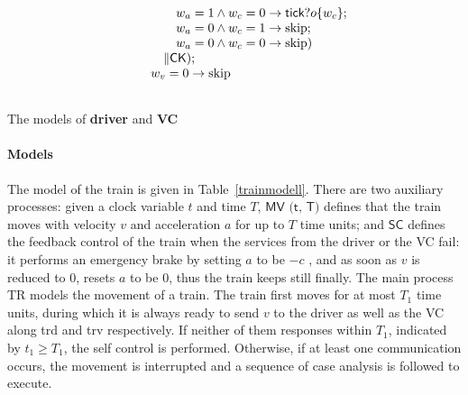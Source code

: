 \documentclass{llncs}
\newcommand{\pskip}{\textmd{skip}}
\begin{document}
\begin{table}[t]
\begin{minipage}{0.5\linewidth}
\[\begin{array}{lll}
&&  \quad  \quad\ w_a = 1 \wedge w_c = 0 \rightarrow \textsf{tick}?o\{w_c\};\\
&&  \quad\quad\  w_a = 0 \wedge w_c = 1 \rightarrow \pskip;\\
&& \quad\quad\  w_a = 0 \wedge w_c = 0 \rightarrow \pskip)\\
&& \quad \  \| \textsf{CK}
);\\
&&\ w_v = 0 \rightarrow \pskip \\
\\
\end{array} \]
\end{minipage}
\caption{The models of \textbf{driver} and \textbf{VC}}
\label{driverevc}
\end{table}



\paragraph{\textbf{Models}}
The model of the train is given in Table~\ref{trainmodell}. There are two auxiliary processes:
given a clock variable $t$ and  time  $T$,
$\textsf{MV (t, T)}$ defines that the train moves with velocity $v$ and acceleration $a$
for up to $T$ time units;
and $\textsf{SC}$ defines the feedback control of the train when the services from
the driver or the VC fail: it performs
an emergency brake by setting
  $a$ to be $-c$ ,  and
as soon as $v$ is reduced to $0$, resets $a$ to be $0$, thus the train keeps still finally.
The main process \textsf{TR}
models the movement of a train. The train first moves for at most $T_1$ time units,
during which it is always ready to
send $v$ to the driver as well as the VC along \textsf{trd} and \textsf{trv} respectively.
If neither of them responses within $T_1$, indicated by $t_1 \geq T_1$,
the self control is performed.
Otherwise, if at least one communication occurs,
the movement is interrupted and a sequence of
case analysis is followed to execute.
\end{document}
